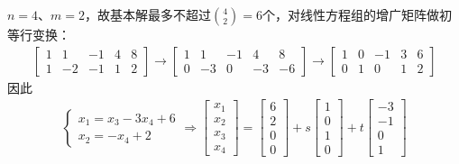 \documentclass{ctexart}
\begin{document}
\begin{example}
    $n=4$、$m=2$，故基本解最多不超过$\binom{4}{2}=6$个，对线性方程组的增广矩阵做初等行变换：
    \begin{align*}
        \begin{bmatrix}
            1 & 1  & -1 & 4 & 8 \\
            1 & -2 & -1 & 1 & 2
        \end{bmatrix} \longrightarrow
        \begin{bmatrix}
            1 & 1  & -1 & 4  & 8  \\
            0 & -3 & 0  & -3 & -6
        \end{bmatrix} \longrightarrow
        \begin{bmatrix}
            1 & 0 & -1 & 3 & 6 \\
            0 & 1 & 0  & 1 & 2
        \end{bmatrix}
    \end{align*}
    因此
    \begin{align*}
        \begin{cases}
            x_1 = x_3 - 3 x_4 + 6 \\
            x_2 = - x_4 + 2
        \end{cases} \Longrightarrow
        \begin{bmatrix}
            x_1 \\ x_2 \\ x_3 \\ x_4
        \end{bmatrix} =
        \begin{bmatrix}
            6 \\ 2 \\ 0 \\ 0
        \end{bmatrix} + s
        \begin{bmatrix}
            1 \\ 0 \\ 1 \\ 0
        \end{bmatrix} + t
        \begin{bmatrix}
            -3 \\ -1 \\ 0 \\ 1
        \end{bmatrix}
    \end{align*}
\end{example}
\end{document}

